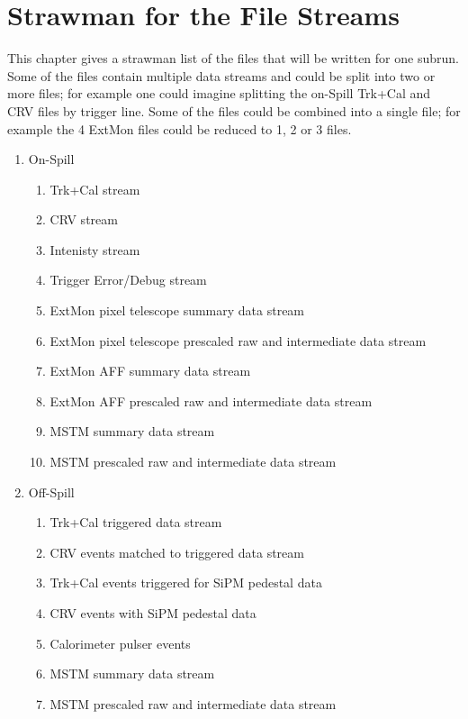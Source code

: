 \chapter{Strawman for the File Streams}
\label{ch:file_streams}

This chapter gives a strawman list of the files that will be written for one subrun.
Some of the files contain multiple data streams and could be split into two or more files;
for example one could imagine splitting the on-Spill Trk+Cal and CRV files by trigger line.
Some of the files could be combined into a single file; for example the 4 ExtMon files could
be reduced to 1, 2 or 3 files.


\begin{enumerate}
\item On-Spill
  \begin{enumerate}
    \item Trk+Cal stream
    \item CRV stream
    \item Intenisty stream
    \item Trigger Error/Debug stream
    \item ExtMon pixel telescope summary data stream
    \item ExtMon pixel telescope prescaled raw and intermediate data stream
    \item ExtMon AFF  summary data stream
    \item ExtMon AFF prescaled raw and intermediate data stream
    \item MSTM summary data stream
    \item MSTM prescaled raw and intermediate data stream
  \end{enumerate}
%
\item Off-Spill
  \begin{enumerate}
    \item Trk+Cal triggered data stream
    \item CRV events matched to triggered data stream
    \item Trk+Cal events triggered for SiPM pedestal data
    \item CRV events with SiPM pedestal data
    \item Calorimeter pulser events
    \item MSTM summary data stream
    \item MSTM prescaled raw and intermediate data stream
  \end{enumerate}
\end{enumerate}


